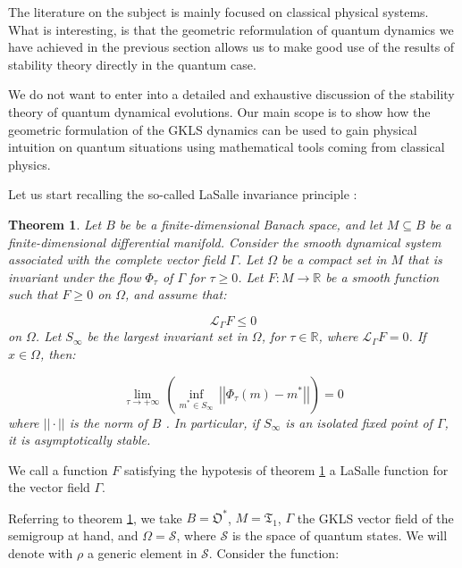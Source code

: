 \documentclass[11pt]{article}
\newcommand{\be}{\begin{equation}}
\newcommand{\ee}{\end{equation}}
\newcommand{\vsp}{\vspace{0.4cm}}
\newcommand{\stsp}{\mathcal{S}}
\newcommand{\obsp}{\mathfrak{O}}
\newtheorem{thm}{Theorem}
\begin{document}
The literature on the subject is mainly focused on classical physical systems.
What is interesting, is that the geometric reformulation of quantum dynamics we have achieved in the previous section allows us to make good use of the results of stability theory directly in the quantum case.




We do not want to enter into a detailed and exhaustive discussion of the stability theory of quantum dynamical evolutions.
Our main scope is to show how the geometric formulation of the GKLS dynamics can be used to gain physical intuition on  quantum situations using mathematical tools coming from classical physics.

\vsp



Let us start recalling  the so-called LaSalle invariance principle \cite{lasalle-some_extensions_of_liapunov_second_method,abraham_marsden_ratiu-manifolds_tensor_analysis_and_applications}:

\begin{thm}\label{thm: lasalle invariance principle}
Let $B$ be be a finite-dimensional Banach space, and let $M\subseteq B$ be a finite-dimensional differential manifold. 
Consider the smooth dynamical system associated with the complete vector field $\Gamma$.
Let $\Omega$ be a compact set in $M$ that is invariant under the flow $\Phi_{\tau}$ of $\Gamma$ for $\tau\geq0$.
Let $F\colon M\rightarrow\mathbb{R}$ be a smooth function such that $F\geq0$ on $\Omega$, and assume that:

\be
\mathcal{L}_{\Gamma}F\leq 0
\ee
on $\Omega$.
Let $S_{\infty}$ be the largest invariant set in $\Omega$, for $\tau\in\mathbb{R}$, where $\mathcal{L}_{\Gamma}F=0$.
If $x\in\Omega$, then:

\be
\lim_{\tau\rightarrow+\infty}\,\left(\inf_{m^{*}\in S_{\infty}}\,\left|\left|\Phi_{\tau}(m) - m^{*}\right|\right|\right)=0
\ee 
where $||\cdot||$ is the norm of $B$ .
In particular, if $S_{\infty}$ is an isolated fixed point of $\Gamma$, it is asymptotically stable.
\end{thm}

We call a function $F$ satisfying the hypotesis of theorem \ref{thm: lasalle invariance principle} a LaSalle function for the vector field $\Gamma$.





Referring to theorem \ref{thm: lasalle invariance principle}, we take $B=\obsp^{*}$, $M=\mathfrak{T}_{1}$, $\Gamma$ the GKLS vector field of the semigroup at hand, and $\Omega=\stsp$, where $\stsp$ is the space of quantum states.
We will denote with $\rho$ a generic element in $\stsp$.
Consider the function:
\end{document}
